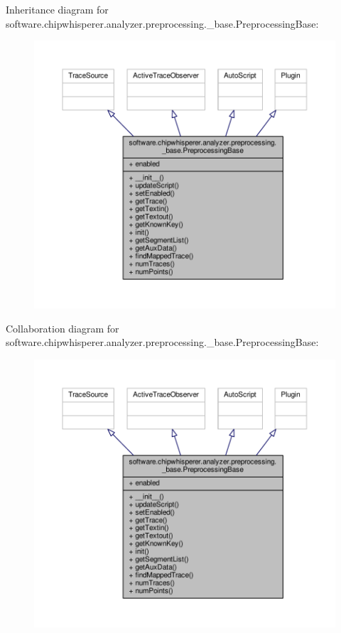 Inheritance diagram for software.\+chipwhisperer.\+analyzer.\+preprocessing.\+\_\+base.\+Preprocessing\+Base\+:\nopagebreak
\begin{figure}[H]
\begin{center}
\leavevmode
\includegraphics[width=350pt]{dd/d71/classsoftware_1_1chipwhisperer_1_1analyzer_1_1preprocessing_1_1__base_1_1PreprocessingBase__inherit__graph}
\end{center}
\end{figure}


Collaboration diagram for software.\+chipwhisperer.\+analyzer.\+preprocessing.\+\_\+base.\+Preprocessing\+Base\+:\nopagebreak
\begin{figure}[H]
\begin{center}
\leavevmode
\includegraphics[width=350pt]{df/dd0/classsoftware_1_1chipwhisperer_1_1analyzer_1_1preprocessing_1_1__base_1_1PreprocessingBase__coll__graph}
\end{center}
\end{figure}


